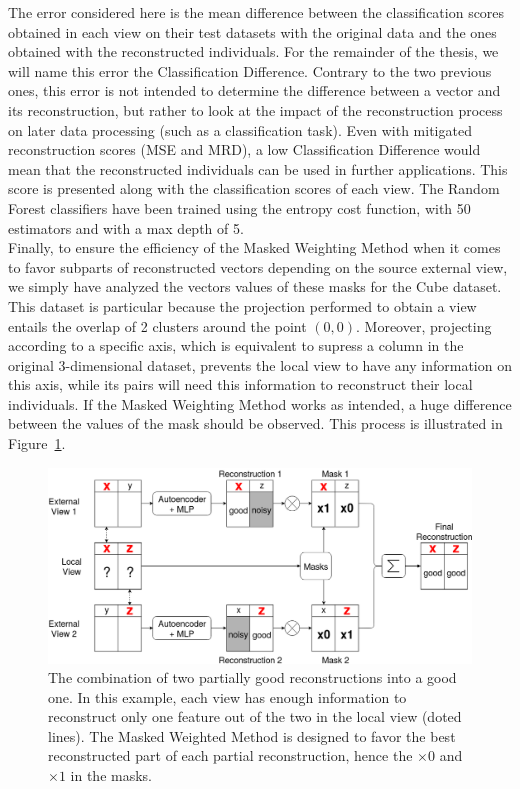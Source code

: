 The error considered here is the mean difference between the classification scores obtained in each view on their test datasets with the original data and the ones obtained with the reconstructed individuals. For the remainder of the thesis, we will name this error the Classification Difference. Contrary to the two previous ones, this error is not intended to determine the difference between a vector and its reconstruction, but rather to look at the impact of the reconstruction process on later data processing (such as a classification task). Even with mitigated reconstruction scores (MSE and MRD), a low Classification Difference would mean that the reconstructed individuals can be used in further applications. This score is presented along with the classification scores of each view. The Random Forest classifiers have been trained using the entropy cost function, with 50 estimators and with a max depth of 5.\\

Finally, to ensure the efficiency of the Masked Weighting Method when it comes 
to favor subparts of reconstructed vectors depending on the source external 
view, we simply have analyzed the vectors values of these masks for the Cube 
dataset. This dataset is particular because the projection performed to obtain a 
view entails the overlap of 2 clusters around the point $(0,0)$. Moreover, 
projecting according to a specific axis, which is equivalent to supress a column 
in the original 3-dimensional dataset, prevents the local view to have any 
information on this axis, while its pairs will need this information to 
reconstruct their local individuals. If the Masked Weighting Method works as 
intended, a huge difference between the values of the mask should be observed. 
This process is illustrated in Figure~\ref{fig:process_mwm}.

\begin{figure}[h]
    \centering
    \includegraphics[scale=.3]{img/process_mwm.png}
    \caption{The combination of two partially good reconstructions into a good one. In this example, each view has enough information to reconstruct only one feature out of the two in the local view (doted lines). The Masked Weighted Method is designed to favor the best reconstructed part of each partial reconstruction, hence the $\times 0$ and $\times 1$ in the masks.}
\label{fig:process_mwm}
\end{figure}
	
